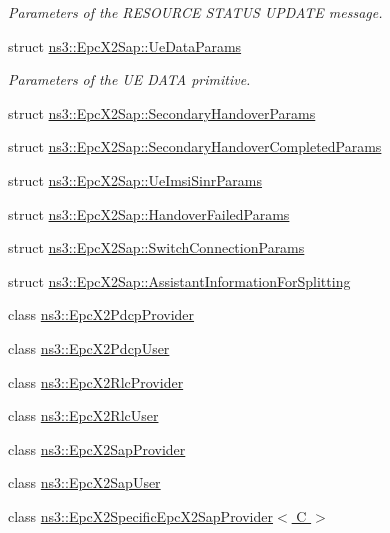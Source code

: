 \begin{DoxyCompactItemize}
\begin{DoxyCompactList}\small\item\em Parameters of the R\+E\+S\+O\+U\+R\+CE S\+T\+A\+T\+US U\+P\+D\+A\+TE message. \end{DoxyCompactList}\item 
struct \hyperlink{structns3_1_1EpcX2Sap_1_1UeDataParams}{ns3\+::\+Epc\+X2\+Sap\+::\+Ue\+Data\+Params}
\begin{DoxyCompactList}\small\item\em Parameters of the UE D\+A\+TA primitive. \end{DoxyCompactList}\item 
struct \hyperlink{structns3_1_1EpcX2Sap_1_1SecondaryHandoverParams}{ns3\+::\+Epc\+X2\+Sap\+::\+Secondary\+Handover\+Params}
\item 
struct \hyperlink{structns3_1_1EpcX2Sap_1_1SecondaryHandoverCompletedParams}{ns3\+::\+Epc\+X2\+Sap\+::\+Secondary\+Handover\+Completed\+Params}
\item 
struct \hyperlink{structns3_1_1EpcX2Sap_1_1UeImsiSinrParams}{ns3\+::\+Epc\+X2\+Sap\+::\+Ue\+Imsi\+Sinr\+Params}
\item 
struct \hyperlink{structns3_1_1EpcX2Sap_1_1HandoverFailedParams}{ns3\+::\+Epc\+X2\+Sap\+::\+Handover\+Failed\+Params}
\item 
struct \hyperlink{structns3_1_1EpcX2Sap_1_1SwitchConnectionParams}{ns3\+::\+Epc\+X2\+Sap\+::\+Switch\+Connection\+Params}
\item 
struct \hyperlink{structns3_1_1EpcX2Sap_1_1AssistantInformationForSplitting}{ns3\+::\+Epc\+X2\+Sap\+::\+Assistant\+Information\+For\+Splitting}
\item 
class \hyperlink{classns3_1_1EpcX2PdcpProvider}{ns3\+::\+Epc\+X2\+Pdcp\+Provider}
\item 
class \hyperlink{classns3_1_1EpcX2PdcpUser}{ns3\+::\+Epc\+X2\+Pdcp\+User}
\item 
class \hyperlink{classns3_1_1EpcX2RlcProvider}{ns3\+::\+Epc\+X2\+Rlc\+Provider}
\item 
class \hyperlink{classns3_1_1EpcX2RlcUser}{ns3\+::\+Epc\+X2\+Rlc\+User}
\item 
class \hyperlink{classns3_1_1EpcX2SapProvider}{ns3\+::\+Epc\+X2\+Sap\+Provider}
\item 
class \hyperlink{classns3_1_1EpcX2SapUser}{ns3\+::\+Epc\+X2\+Sap\+User}
\item 
class \hyperlink{classns3_1_1EpcX2SpecificEpcX2SapProvider}{ns3\+::\+Epc\+X2\+Specific\+Epc\+X2\+Sap\+Provider$<$ C $>$}
\item 

\end{DoxyCompactItemize}
